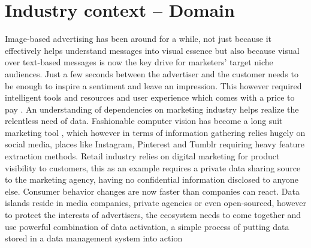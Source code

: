 \documentclass[preprint,12pt]{elsarticle}
\begin{document}
\section{Industry context – Domain}
Image-based advertising has been around for a while, not just because it effectively helps understand messages into visual essence but also because visual over text-based messages is now the key drive for marketers’ target niche audiences. Just a few seconds between the advertiser and the customer needs to be enough to inspire a sentiment and leave an impression. This however required intelligent tools and resources and user experience which comes with a price to pay \cite{Ben2018}.
An understanding of dependencies on marketing industry helps realize the relentless need of data. Fashionable computer vision has become a long suit marketing tool \cite{WideEyes2017AI}, which however in terms of information gathering relies hugely on social media, places like Instagram, Pinterest and Tumblr requiring heavy feature extraction methods. Retail industry relies on digital marketing for product visibility to customers, this as an example requires a private data sharing source to the marketing agency, having no confidential information disclosed to anyone else.
Consumer behavior changes are now faster than companies can react. Data islands reside in media companies, private agencies or even open-sourced, however to protect the interests of advertisers, the ecosystem needs to come together and use powerful combination of data activation, a simple process of putting data stored in a data management system into action \cite{Maciej2016}
\end{document}
